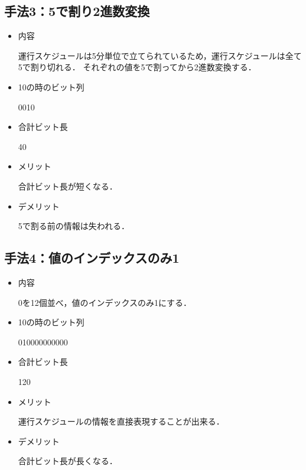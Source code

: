 \documentclass[main]{subfiles}
\begin{document}
        \subsection{手法3：5で割り2進数変換}
        \begin{itemize}
            \item 内容
            
                運行スケジュールは5分単位で立てられているため，運行スケジュールは全て5で割り切れる．
                それぞれの値を5で割ってから2進数変換する．
            \item 10の時のビット列
                
                0010
            \item 合計ビット長
            
                40
            \item メリット
            
                合計ビット長が短くなる．
            \item デメリット
                
                5で割る前の情報は失われる．
            
        \end{itemize}
        \subsection{手法4：値のインデックスのみ1}
        \begin{itemize}
            \item 内容
            
                0を12個並べ，値のインデックスのみ1にする．
            \item 10の時のビット列
                
                010000000000
            \item 合計ビット長
            
                120
            \item メリット
            
                運行スケジュールの情報を直接表現することが出来る．
            \item デメリット
                
                合計ビット長が長くなる．
            
        \end{itemize}
\end{document}
